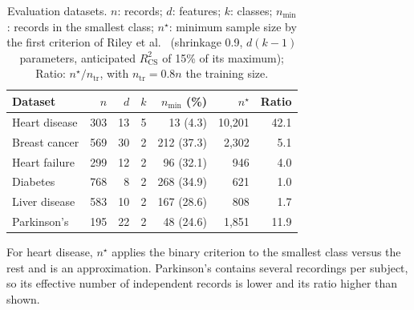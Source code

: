 \documentclass[conference]{IEEEtran}
\begin{document}
\begin{table}[t]
\centering
\caption{Evaluation datasets. $n$: records; $d$: features; $k$: classes; $n_{\min}$: records in the smallest class; $n^{\star}$: minimum sample size by the first criterion of Riley et al.~\cite{riley2019binary} (shrinkage 0.9, $d(k-1)$ parameters, anticipated $R^2_{\mathrm{CS}}$ of 15\% of its maximum); Ratio: $n^{\star}/n_{\mathrm{tr}}$, with $n_{\mathrm{tr}}=0.8n$ the training size.}
\label{tab:datasets}
\footnotesize
\setlength{\tabcolsep}{3pt}
\begin{tabular*}{\columnwidth}{@{\extracolsep{\fill}}lrrrrrr@{}}
\toprule
Dataset & $n$ & $d$ & $k$ & $n_{\min}$ (\%) & $n^{\star}$ & Ratio \\
\midrule
Heart disease & 303 & 13 & 5 & 13 (4.3) & 10,201 & 42.1 \\
Breast cancer & 569 & 30 & 2 & 212 (37.3) & 2,302 & 5.1 \\
Heart failure & 299 & 12 & 2 & 96 (32.1) & 946 & 4.0 \\
Diabetes & 768 & 8 & 2 & 268 (34.9) & 621 & 1.0 \\
Liver disease & 583 & 10 & 2 & 167 (28.6) & 808 & 1.7 \\
Parkinson's & 195 & 22 & 2 & 48 (24.6) & 1,851 & 11.9 \\
\bottomrule
\end{tabular*}
\par\vspace{2pt}\raggedright\scriptsize For heart disease, $n^{\star}$ applies the binary criterion to the smallest class versus the rest and is an approximation. Parkinson's contains several recordings per subject, so its effective number of independent records is lower and its ratio higher than shown.
\end{table}
\end{document}
